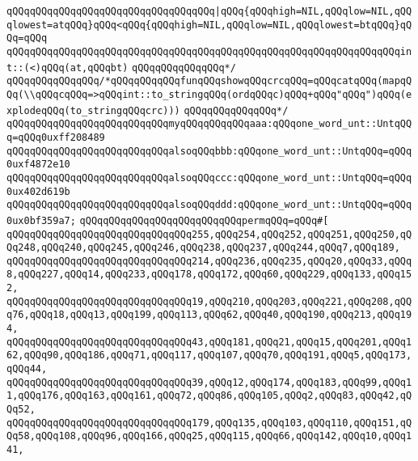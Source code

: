 \verb|qQQqqQQqqQQqqQQqqQQqqQQqqQQqqQQqqQQq|\verb#|qQQq{qQQqhigh=NIL,qQQqlow=NIL,qQQqlowest=atqQQq}qQQq<qQQq{qQQqhigh=NIL,qQQqlow=NIL,qQQqlowest=btqQQq}qQQq=qQQq#\newline
\verb|qQQqqQQqqQQqqQQqqQQqqQQqqQQqqQQqqQQqqQQqqQQqqQQqqQQqqQQqqQQqqQQqqQQqint::(<)qQQq(at,qQQqbt)|\newline
\verb|qQQqqQQqqQQqqQQq*/|\newline
\verb|qQQqqQQqqQQqqQQq/*qQQqqQQqqQQqfunqQQqshowqQQqcrcqQQq=qQQqcatqQQq(mapqQQq(\\qQQqcqQQq=>qQQqint::to_stringqQQq(ordqQQqc)qQQq+qQQq"qQQq")qQQq(explodeqQQq(to_stringqQQqcrc)))|\newline
\verb|qQQqqQQqqQQqqQQq*/|\newline
\newline
\verb|qQQqqQQqqQQqqQQqqQQqqQQqqQQqmyqQQqqQQqqQQqaaa:qQQqone_word_unt::UntqQQq=qQQq0uxff208489|\newline
\verb|qQQqqQQqqQQqqQQqqQQqqQQqqQQqalsoqQQqbbb:qQQqone_word_unt::UntqQQq=qQQq0uxf4872e10|\newline
\verb|qQQqqQQqqQQqqQQqqQQqqQQqqQQqalsoqQQqccc:qQQqone_word_unt::UntqQQq=qQQq0ux402d619b|\newline
\verb|qQQqqQQqqQQqqQQqqQQqqQQqqQQqalsoqQQqddd:qQQqone_word_unt::UntqQQq=qQQq0ux0bf359a7;|\newline
\newline
\newline
\verb|qQQqqQQqqQQqqQQqqQQqqQQqqQQqpermqQQq=qQQq#[|\newline
\verb|qQQqqQQqqQQqqQQqqQQqqQQqqQQqqQQq255,qQQq254,qQQq252,qQQq251,qQQq250,qQQq248,qQQq240,qQQq245,qQQq246,qQQq238,qQQq237,qQQq244,qQQq7,qQQq189,|\newline
\verb|qQQqqQQqqQQqqQQqqQQqqQQqqQQqqQQq214,qQQq236,qQQq235,qQQq20,qQQq33,qQQq8,qQQq227,qQQq14,qQQq233,qQQq178,qQQq172,qQQq60,qQQq229,qQQq133,qQQq152,|\newline
\verb|qQQqqQQqqQQqqQQqqQQqqQQqqQQqqQQq19,qQQq210,qQQq203,qQQq221,qQQq208,qQQq76,qQQq18,qQQq13,qQQq199,qQQq113,qQQq62,qQQq40,qQQq190,qQQq213,qQQq194,|\newline
\verb|qQQqqQQqqQQqqQQqqQQqqQQqqQQqqQQq43,qQQq181,qQQq21,qQQq15,qQQq201,qQQq162,qQQq90,qQQq186,qQQq71,qQQq117,qQQq107,qQQq70,qQQq191,qQQq5,qQQq173,qQQq44,|\newline
\verb|qQQqqQQqqQQqqQQqqQQqqQQqqQQqqQQq39,qQQq12,qQQq174,qQQq183,qQQq99,qQQq11,qQQq176,qQQq163,qQQq161,qQQq72,qQQq86,qQQq105,qQQq2,qQQq83,qQQq42,qQQq52,|\newline
\verb|qQQqqQQqqQQqqQQqqQQqqQQqqQQqqQQq179,qQQq135,qQQq103,qQQq110,qQQq151,qQQq58,qQQq108,qQQq96,qQQq166,qQQq25,qQQq115,qQQq66,qQQq142,qQQq10,qQQq141,|\newline
